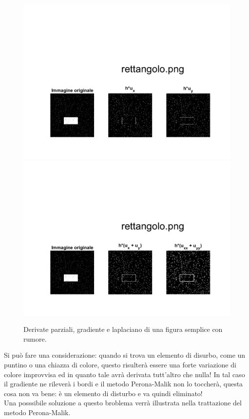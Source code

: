 \newpage
\begin{figure}   
\centering
\includegraphics[scale=0.4, trim = 0 0 0 10.5cm, clip]{Pictures/Risultati/rettangolo bianco e nero derivate parziali con rumore.png}
\includegraphics[scale=0.4, trim = 0 0 0 10.5cm, clip]{Pictures/Risultati/rettangolo bianco e nero gradiente e laplaciano con rumore.png}
\caption{Derivate parziali, gradiente e laplaciano di una figura semplice con rumore.}\label{fig:figura}
\end{figure}

Si può fare una considerazione: quando si trova un elemento di disurbo, come un puntino o una chiazza di colore, questo risulterà essere una forte variazione di colore improvvisa ed in quanto tale avrà derivata tutt'altro che nulla!
In tal caso il gradiente ne rileverà i bordi e il metodo Perona-Malik non lo toccherà, questa cosa non va bene: è un elemento di disturbo e va quindi eliminato!\\ Una posssibile soluzione a questo broblema verrà illustrata nella trattazione del metodo Perona-Malik.
